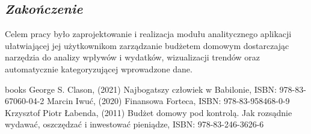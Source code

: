 \documentclass[a4paper,10pt, twoside]{report}
\newcommand{\customstylechapter}[1]{\large{\textit{#1}}}
\newcommand{\customstylesection}[1]{\textbf{\textit{#1}}}
\begin{document}
\begin{large}
\chapter{\customstylechapter{Zakończenie}}
{Celem pracy było zaprojektowanie i realizacja modułu analitycznego aplikacji 
ułatwiającej jej użytkownikom zarządzanie budżetem domowym dostarczając 
narzędzia do analizy wpływów i wydatków, wizualizacji trendów oraz automatycznie 
kategoryzującej wprowadzone dane.}







\begin{thebibliography} {books}
     George S. Clason, (2021) Najbogatszy człowiek w Babilonie, ISBN: 978-83-67060-04-2
     Marcin Iwuć, (2020) Finansowa Forteca, ISBN: 978-83-958468-0-9
     Krzysztof Piotr Łabenda, (2011) Budżet domowy pod kontrolą. Jak rozsądnie wydawać, oszczędzać i inwestować pieniądze, ISBN: 978-83-246-3626-6


\end{thebibliography}
\end{large}
\end{document}
